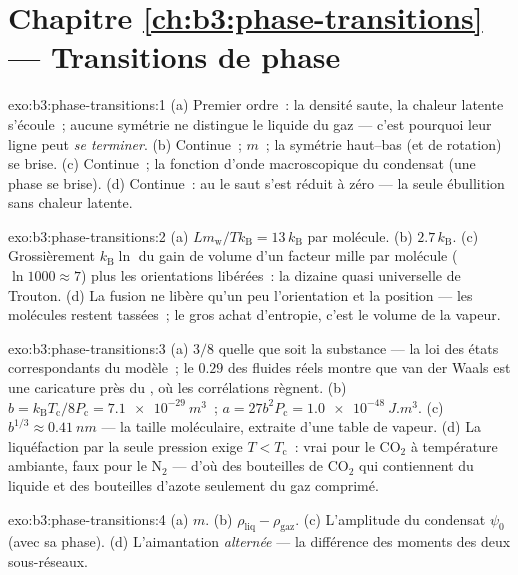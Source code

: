 \section*{Chapitre \ref{ch:b3:phase-transitions} --- Transitions de phase}

\begin{solution}{exo:b3:phase-transitions:1}
(a) Premier ordre~: la densité saute, la chaleur latente s'écoule~;
aucune symétrie ne distingue le liquide du gaz --- c'est pourquoi
leur ligne peut \emph{se terminer}. (b) Continue~; 
$m$~; la symétrie haut--bas (et de rotation) se brise. (c)
Continue~; la fonction d'onde macroscopique du condensat (une phase
se brise). (d) Continue~: au  le saut s'est réduit à
zéro --- la seule ébullition sans chaleur latente.
\end{solution}

\begin{solution}{exo:b3:phase-transitions:2}
(a) $Lm_{\text{w}}/Tk_{\text{B}} = 13\,k_{\text{B}}$ par molécule.
(b) $2.7\,k_{\text{B}}$. (c) Grossièrement $k_{\text{B}}\ln$ du gain
de volume d'un facteur mille par molécule ($\ln1000 \approx 7$) plus
les orientations libérées~: la dizaine quasi universelle de
Trouton. (d) La fusion ne libère qu'un peu l'orientation et la
position --- les molécules restent tassées~; le gros achat
d'entropie, c'est le volume de la vapeur.
\end{solution}

\begin{solution}{exo:b3:phase-transitions:3}
(a) $3/8$ quelle que soit la substance --- la loi des états
correspondants du modèle~; le $0.29$ des fluides réels montre que van
der Waals est une caricature près du , où les
corrélations règnent. (b) $b =
k_{\text{B}}T_{\text{c}}/8P_{\text{c}} = \qty{7.1e-29}{m^3}$~; $a =
27b^2P_{\text{c}} = \qty{1.0e-48}{J.m^3}$. (c) $b^{1/3} \approx
\qty{0.41}{nm}$ --- la taille moléculaire, extraite d'une table de
vapeur. (d) La liquéfaction par la seule pression exige $T <
T_{\text{c}}$~: vrai pour le CO$_2$ à température ambiante, faux
pour le N$_2$ --- d'où des bouteilles de CO$_2$ qui contiennent du
liquide et des bouteilles d'azote seulement du gaz comprimé.
\end{solution}

\begin{solution}{exo:b3:phase-transitions:4}
(a) $m$. (b) $\rho_{\text{liq}} - \rho_{\text{gaz}}$. (c)
L'amplitude du condensat $\psi_0$ (avec sa phase). (d)
L'aimantation \emph{alternée} --- la différence des moments des deux
sous-réseaux.
\end{solution}


